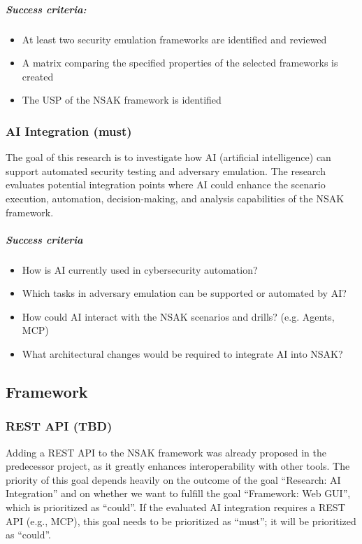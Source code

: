 \subparagraph{Success criteria:}

\begin{itemize}
	\item At least two security emulation frameworks are identified and reviewed
	\item A matrix comparing the specified properties of the selected frameworks is created
	\item The USP of the NSAK framework is identified
\end{itemize}

\subsubsection{AI Integration (must)}

The goal of this research is to investigate how AI (artificial intelligence) can support automated security testing and adversary emulation. The research evaluates potential integration points where AI could enhance the scenario execution, automation, decision-making, and analysis capabilities of the NSAK framework.

\subparagraph{Success criteria}

\begin{itemize}
	\item How is AI currently used in cybersecurity automation?
	\item Which tasks in adversary emulation can be supported or automated by AI?
	\item How could AI interact with the NSAK scenarios and drills? (e.g. Agents, MCP)
	\item What architectural changes would be required to integrate AI into NSAK?
\end{itemize}

\subsection{Framework}

\subsubsection{REST API (TBD)}

Adding a REST API to the NSAK framework was already proposed in the predecessor project, as it greatly enhances interoperability with other tools. The priority of this goal depends heavily on the outcome of the goal ``Research: AI Integration'' and on whether we want to fulfill the goal ``Framework: Web GUI'', which is prioritized as ``could''. If the evaluated AI integration requires a REST API (e.g., MCP), this goal needs to be prioritized as ``must''; it will be prioritized as ``could''.

